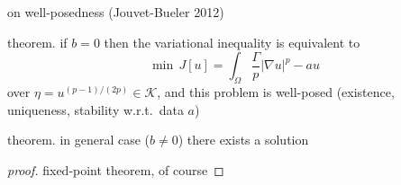 \documentclass[hide notes,intlimits]{beamer}
\newcommand{\Kcal}{\mathcal{K}}
\newcommand{\grad}{\nabla}
\begin{document}
\begin{frame}{on well-posedness (Jouvet-Bueler 2012)} 
\begin{block}{theorem.}
if $b=0$ then the variational inequality is equivalent to
  $$\min \, J[u] = \int_{\Omega} \frac{\Gamma}{p} |\grad u|^p - a u$$
over $\eta = u^{(p-1)/(2p)} \in \Kcal$, and this problem is well-posed (existence, uniqueness, stability w.r.t.~data $a$)
\end{block}
\begin{block}{theorem.}
in general case ($b\ne 0$) there exists a solution
\end{block}
\begin{proof}[proof]
fixed-point theorem, of course
\end{proof}
\end{frame}
\end{document}
